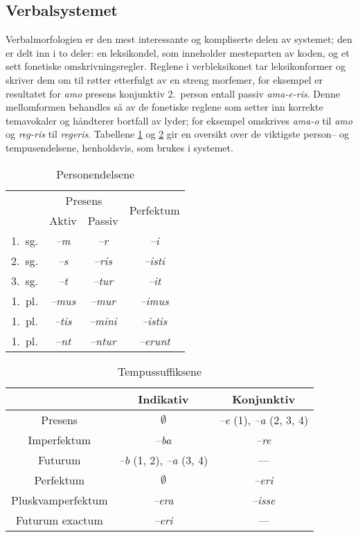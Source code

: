 \documentclass{article}
\newcommand\w[1]{\emph{#1}}
\begin{document}
\subsection{Verbalsystemet}
\label{konjugasjon}
Verbalmorfologien er den mest interessante og kompliserte delen av systemet;
den er delt inn i to deler: en leksikondel, som inneholder mesteparten av
koden, og et sett fonetiske omskrivningsregler. Reglene i verbleksikonet tar
leksikonformer og skriver dem om til r\o{}tter etterfulgt av en streng
morfemer, for eksempel er resultatet for \w{amo} presens konjunktiv 2.~person
entall passiv \w{ama-e-ris}. Denne mellomformen behandles s\aa{} av de
fonetiske reglene som setter inn korrekte temavokaler og h\aa{}ndterer
bortfall av lyder; for eksempel omskrives \w{ama-o} til \w{amo} og \w{reg-ris}
til \w{regeris}. Tabellene \ref{endelser} og \ref{tempus} gir en oversikt over
de viktigste person-- og tempusendelsene, henholdsvis, som brukes i systemet.

\begin{table}
\begin{center}
\begin{tabular}{|c|c|c|c|}
    \hline
       & \multicolumn{2}{c|}{Presens} & \multirow{2}{*}{Perfektum} \\ \cline{2-3}
       & Aktiv & Passiv & \\
    \hline
1.~sg. & \w{--m}   & \w{--r}    & \w{--i}     \\
2.~sg. & \w{--s}   & \w{--ris}  & \w{--isti}  \\
3.~sg. & \w{--t}   & \w{--tur}  & \w{--it}    \\
1.~pl. & \w{--mus} & \w{--mur}  & \w{--imus}  \\
1.~pl. & \w{--tis} & \w{--mini} & \w{--istis} \\
1.~pl. & \w{--nt}  & \w{--ntur} & \w{--erunt} \\
    \hline
\end{tabular}
\caption{Personendelsene}
\label{endelser}
\end{center}
\end{table}

\begin{table}
\begin{center}
\begin{tabular}{|c|c|c|}
    \hline
                  & Indikativ   & Konjunktiv \\
    \hline
Presens           & $\emptyset$ & \w{--e} (1), \w{--a} (2, 3, 4) \\
Imperfektum       & \w{--ba} & \w{--re} \\
Futurum           & \w{--b} (1, 2), \w{--a} (3, 4) & --- \\
    \hline
Perfektum         & $\emptyset$ & \w{--eri} \\
Pluskvamperfektum & \w{--era} & \w{--isse} \\
Futurum exactum   & \w{--eri} & ---        \\
    \hline
\end{tabular}
\caption{Tempussuffiksene}
\label{tempus}
\end{center}
\end{table}
\end{document}
